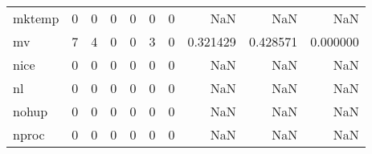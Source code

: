 \begin{tabular}{lrrrrrrrrr}
mktemp    &                                                  0 &                                                  0 &                                                  0 &                                                  0 &                                                  0 &                                                  0 &                                                NaN &                                    NaN &                                  NaN \\
mv        &                                                  7 &                                                  4 &                                                  0 &                                                  0 &                                                  3 &                                                  0 &                                           0.321429 &                               0.428571 &                             0.000000 \\
nice      &                                                  0 &                                                  0 &                                                  0 &                                                  0 &                                                  0 &                                                  0 &                                                NaN &                                    NaN &                                  NaN \\
nl        &                                                  0 &                                                  0 &                                                  0 &                                                  0 &                                                  0 &                                                  0 &                                                NaN &                                    NaN &                                  NaN \\
nohup     &                                                  0 &                                                  0 &                                                  0 &                                                  0 &                                                  0 &                                                  0 &                                                NaN &                                    NaN &                                  NaN \\
nproc     &                                                  0 &                                                  0 &                                                  0 &                                                  0 &                                                  0 &                                                  0 &                                                NaN &                                    NaN &                                  NaN \\

\end{tabular}
